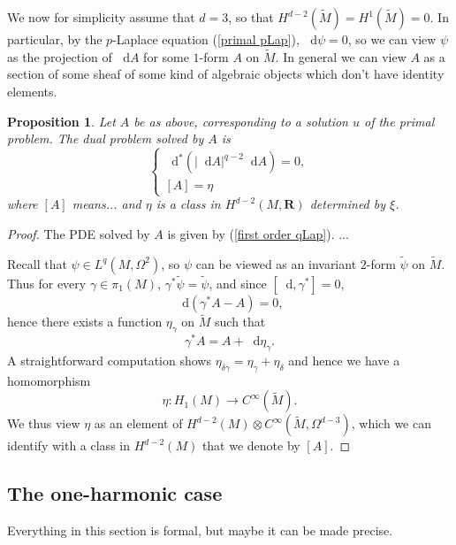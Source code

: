 \documentclass[reqno,12pt]{amsart}
\newcommand{\RR}{\mathbf{R}}
\newcommand*\dif{\mathop{}\!\mathrm{d}}
\newtheorem{proposition}[theorem]{Proposition}
\theoremstyle{definition}
\numberwithin{equation}{section}
\begin{document}
We now for simplicity assume that $d = 3$, so that $H^{d - 2}(\tilde M) = H^1(\tilde M) = 0$.
In particular, by the $p$-Laplace equation (\ref{primal pLap}), $\dif \psi = 0$, so we can view $\psi$ as the projection of $\dif A$ for some $1$-form $A$ on $\tilde M$.
In general we can view $A$ as a section of some sheaf of some kind of algebraic objects which don't have identity elements.

\begin{proposition}
Let $A$ be as above, corresponding to a solution $u$ of the primal problem.
The dual problem solved by $A$ is 
\begin{equation}\label{dual qLap}
\begin{cases}
\dif^*(|\dif A|^{q - 2} \dif A) = 0, \\
[A] = \eta
\end{cases}
\end{equation}
where $[A]$ means... and $\eta$ is a class in $H^{d - 2}(M, \RR)$ determined by $\xi$.
\end{proposition}
\begin{proof}
The PDE solved by $A$ is given by (\ref{first order qLap}). ... 


Recall that $\psi \in L^q(M, \Omega^2)$, so $\psi$ can be viewed as an invariant $2$-form $\tilde \psi$ on $\tilde M$.
Thus for every $\gamma \in \pi_1(M)$, $\gamma^* \tilde \psi = \tilde \psi$, and since $[\dif, \gamma^*] = 0$,
$$\dif(\gamma^* A - A) = 0,$$
hence there exists a function $\eta_\gamma$ on $\tilde M$ such that 
$$\gamma^* A = A + \dif \eta_\gamma.$$
A straightforward computation shows $\eta_{\delta \gamma} = \eta_\gamma + \eta_\delta$ and hence we have a homomorphism 
$$\eta: H_1(M) \to C^\infty(\tilde M).$$
We thus view $\eta$ as an element of $H^{d - 2}(M) \otimes C^\infty(\tilde M, \Omega^{d - 3})$, which we can identify with a class in $H^{d - 2}(M)$ that we denote by $[A]$.
\end{proof}

\subsection{The one-harmonic case}
Everything in this section is formal, but maybe it can be made precise.
\end{document}
